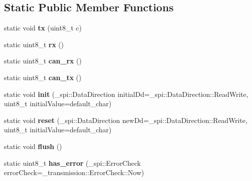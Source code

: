 \subsection*{Static Public Member Functions}
\begin{DoxyCompactItemize}
\item 
static void {\bfseries tx} (uint8\+\_\+t c)\hypertarget{classSpiSlave_a7a93c5ee67495e9e2ab89dc36e70363b}{}\label{classSpiSlave_a7a93c5ee67495e9e2ab89dc36e70363b}

\item 
static uint8\+\_\+t {\bfseries rx} ()\hypertarget{classSpiSlave_a002a0eaf01ab45db97fa956f537c6264}{}\label{classSpiSlave_a002a0eaf01ab45db97fa956f537c6264}

\item 
static uint8\+\_\+t {\bfseries can\+\_\+rx} ()\hypertarget{classSpiSlave_afd0d1035ca45ac012a54c3ff42e94985}{}\label{classSpiSlave_afd0d1035ca45ac012a54c3ff42e94985}

\item 
static uint8\+\_\+t {\bfseries can\+\_\+tx} ()\hypertarget{classSpiSlave_ae7c8db95f89ae369fd14601083dcf393}{}\label{classSpiSlave_ae7c8db95f89ae369fd14601083dcf393}

\item 
static void {\bfseries init} (\+\_\+spi\+::\+Data\+Direction initial\+Dd=\+\_\+spi\+::\+Data\+Direction\+::\+Read\+Write, uint8\+\_\+t initial\+Value=default\+\_\+char)\hypertarget{classSpiSlave_af970f2b3c7b0aa2e0c47d4848c39d2a7}{}\label{classSpiSlave_af970f2b3c7b0aa2e0c47d4848c39d2a7}

\item 
static void {\bfseries reset} (\+\_\+spi\+::\+Data\+Direction new\+Dd=\+\_\+spi\+::\+Data\+Direction\+::\+Read\+Write, uint8\+\_\+t initial\+Value=default\+\_\+char)\hypertarget{classSpiSlave_afa098a4ceeea041e478156d11774fa6e}{}\label{classSpiSlave_afa098a4ceeea041e478156d11774fa6e}

\item 
static void {\bfseries flush} ()\hypertarget{classSpiSlave_ae9aca59b22d840e5c0e9139efdd1e43d}{}\label{classSpiSlave_ae9aca59b22d840e5c0e9139efdd1e43d}

\item 
static uint8\+\_\+t {\bfseries has\+\_\+error} (\+\_\+spi\+::\+Error\+Check error\+Check=\+\_\+transmission\+::\+Error\+Check\+::\+Now)\hypertarget{classSpiSlave_a7598120960f7a9b117bae0a7efadd521}{}\label{classSpiSlave_a7598120960f7a9b117bae0a7efadd521}


\end{DoxyCompactItemize}
